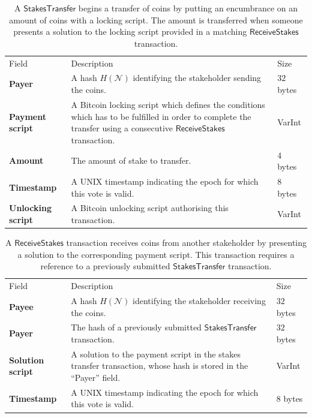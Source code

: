 \documentclass{style/kththesis}
\begin{document}
\begin{appendices}
\begin{table}[ht]
\caption{A $\mathsf{StakesTransfer}$ begins a transfer of coins by putting an encumbrance on an amount of coins with a locking script. The amount is transferred when someone presents a solution to the locking script provided in a matching $\mathsf{ReceiveStakes}$ transaction.}
\label{tab:transfer}
\begin{tabularx}{\textwidth}{lXl}
\cmidrule(r){1-3}
Field & Description & Size \\ 
\cmidrule(r){1-3}
\textbf{Payer} & A hash $H(\mathcal{N})$ identifying the stakeholder sending the coins. & $32$ bytes \\
\textbf{Payment script} & A Bitcoin locking script which defines the conditions which has to be fulfilled in order to complete the transfer using a consecutive $\mathsf{ReceiveStakes}$ transaction. & VarInt \\
\textbf{Amount} & The amount of stake to transfer. & $4$ bytes \\
\textbf{Timestamp} & A UNIX timestamp indicating the epoch for which this vote is valid. & $8$ bytes \\
\textbf{Unlocking script} & A Bitcoin unlocking script authorising this transaction. & VarInt
\end{tabularx}
\end{table}
\begin{table}[ht]
\caption{A $\mathsf{ReceiveStakes}$ transaction receives coins from another stakeholder by presenting a solution to the corresponding payment script. This transaction requires a reference to a previously submitted $\mathsf{StakesTransfer}$ transaction.}
\label{tab:receive}
\begin{tabularx}{\textwidth}{lXl}
\cmidrule(r){1-3}
Field & Description & Size \\ 
\cmidrule(r){1-3}
\textbf{Payee} & A hash $H(\mathcal{N})$ identifying the stakeholder receiving the coins. & $32$ bytes \\
\textbf{Payer} & The hash of a previously submitted $\mathsf{StakesTransfer}$ transaction. & $32$ bytes \\
\textbf{Solution script} & A solution to the payment script in the stakes transfer transaction, whose hash is stored in the ``Payer'' field. & VarInt \\
\textbf{Timestamp} & A UNIX timestamp indicating the epoch for which this vote is valid. & $8$ bytes \\

\end{tabularx}
\end{table}
\end{appendices}
\end{document}
